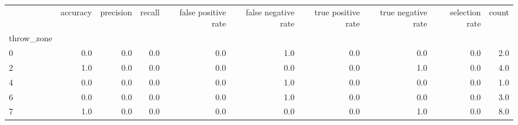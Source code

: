 \begin{tabular}{lrrrrrrrrr}
\toprule
{} &  accuracy &  precision &  recall &  false positive rate &  false negative rate &  true positive rate &  true negative rate &  selection rate &  count \\
throw\_zone &           &            &         &                      &                      &                     &                     &                 &        \\
\midrule
0          &       0.0 &        0.0 &     0.0 &                  0.0 &                  1.0 &                 0.0 &                 0.0 &             0.0 &    2.0 \\
2          &       1.0 &        0.0 &     0.0 &                  0.0 &                  0.0 &                 0.0 &                 1.0 &             0.0 &    4.0 \\
4          &       0.0 &        0.0 &     0.0 &                  0.0 &                  1.0 &                 0.0 &                 0.0 &             0.0 &    1.0 \\
6          &       0.0 &        0.0 &     0.0 &                  0.0 &                  1.0 &                 0.0 &                 0.0 &             0.0 &    3.0 \\
7          &       1.0 &        0.0 &     0.0 &                  0.0 &                  0.0 &                 0.0 &                 1.0 &             0.0 &    8.0 \\
\bottomrule
\end{tabular}

